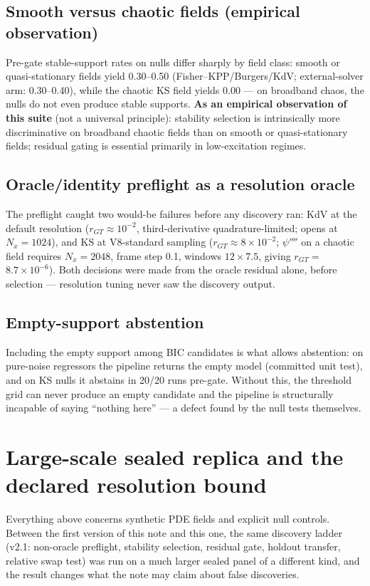 \documentclass[11pt]{article}
\begin{document}
\subsection{Smooth versus chaotic fields (empirical observation)}
\label{sec:smoothchaotic}
Pre-gate stable-support rates on nulls differ sharply by field class:
smooth or quasi-stationary fields yield 0.30--0.50
(Fisher--KPP/Burgers/KdV; external-solver arm:
0.30--0.40), while the chaotic KS field yields
0.00 --- on broadband chaos, the nulls do not even produce stable
supports. \textbf{As an empirical observation of this suite} (not a
universal principle): stability selection is intrinsically more
discriminative on broadband chaotic fields than on smooth or
quasi-stationary fields; residual gating is essential primarily in
low-excitation regimes.

\subsection{Oracle/identity preflight as a resolution oracle}
The preflight caught two would-be failures before any discovery ran: KdV at
the default resolution ($r_{GT} \approx 10^{-2}$, third-derivative
quadrature-limited; opens at $N_x = 1024$), and KS at V8-standard sampling
($r_{GT} \approx 8 \times 10^{-2}$; $\psi''''$ on a chaotic field requires
$N_x = 2048$, frame step 0.1, windows $12 \times 7.5$, giving
$r_{GT} =$ $8.7 \times 10^{-6}$). Both decisions were made from the oracle residual
alone, before selection --- resolution tuning never saw the discovery
output.

\subsection{Empty-support abstention}
Including the empty support among BIC candidates is what allows abstention:
on pure-noise regressors the pipeline returns the empty model (committed
unit test), and on KS nulls it abstains in 20/20 runs pre-gate. Without
this, the threshold grid can never produce an empty candidate and the
pipeline is structurally incapable of saying ``nothing here'' --- a defect
found by the null tests themselves.


\section{Large-scale sealed replica and the declared resolution bound}
\label{sec:v13}
Everything above concerns synthetic PDE fields and explicit null controls.
Between the first version of this note and this one, the same discovery
ladder (v2.1: non-oracle preflight, stability selection, residual gate,
holdout transfer, relative swap test) was run on a much larger sealed panel
of a different kind, and the result changes what the note may claim about
false discoveries.
\end{document}
